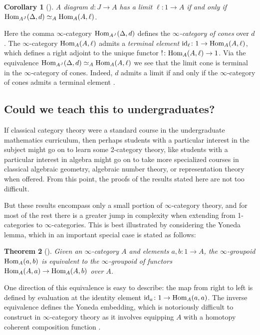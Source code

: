 \documentclass[11pt]{ctexart}
\newtheorem{thm}{Theorem}[section]
\newtheorem{cor}[thm]{Corollary}
\theoremstyle{definition}
\theoremstyle{remark}
\numberwithin{equation}{section}
\newcommand{\id}{\textup{id}}
\newcommand{\Hom}{\textup{Hom}}
\newcommand{\1}{\mathbbe{1}}
\newcommand{\2}{\mathbbe{2}}
\newcommand{\3}{\mathbbe{3}}
\begin{document}
\begin{cor}[{\cite[4.3.1]{RV}}] A diagram $d \colon J \to A$ has a limit $\ell \colon 1 \to A$ if and only if $\Hom_{A^J}(\Delta,d) \simeq_A \Hom_A(A,\ell)$.
\end{cor}

Here the comma $\infty$-category $\Hom_{A^J}(\Delta,d)$ defines the \emph{$\infty$-category of cones} over $d$. The $\infty$-category $\Hom_A(A,\ell)$ admits a \emph{terminal element} $\id_\ell \colon 1 \to \Hom_A(A,\ell)$,  which defines a right adjoint to the unique functor $! \colon \Hom_A(A,\ell) \to 1$. 
Via the equivalence $\Hom_{A^J}(\Delta,d) \simeq_A \Hom_A(A,\ell)$ we see that the limit cone is terminal in the $\infty$-category of cones. Indeed, $d$ admits a limit if and only if the $\infty$-category of cones admits a terminal element \cite[4.3.2]{RV}.

\subsection*{Could we teach this to undergraduates?} If classical category theory were a standard course in the undergraduate mathematics curriculum, then perhaps students with a particular interest in the subject might go on to learn some 2-category theory, like students with a particular interest in algebra might go on to take more specialized courses in classical algebraic geometry, algebraic number theory, or representation theory when offered. From this point, the proofs of the results stated here are not too difficult.

But these results encompass only a small portion of $\infty$-category theory, and for most of the rest there is a greater jump in complexity when extending from 1-categories to $\infty$-categories. This is best illustrated by considering the  Yoneda lemma, which in an important special case is stated as follows:

\begin{thm}[{\cite[5.7.1]{RV}}]\label{thm:yoneda} Given an $\infty$-category $A$ and elements $a,b \colon 1 \to A$, the $\infty$-groupoid $\Hom_A(a,b)$ is equivalent to the $\infty$-groupoid of functors $\Hom_A(A,a) \to \Hom_A(A,b)$ over $A$.
\end{thm}

One direction of this equivalence is easy to describe: the map from right to left is defined by evaluation at the identity element $\id_a \colon 1 \to \Hom_A(a,a)$. The inverse equivalence defines the Yoneda embedding, which is notoriously difficult to construct in $\infty$-category theory as it involves equipping $A$ with a homotopy coherent composition function \cite[\S 5.1.3]{lurie-topos}.
\end{document}
